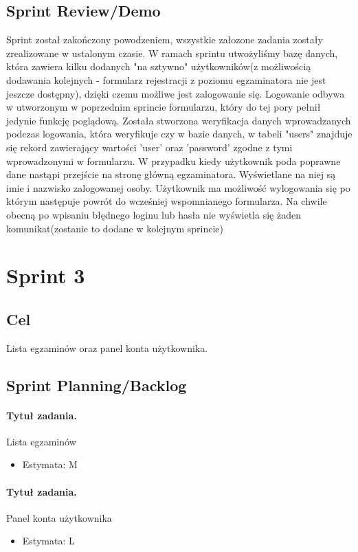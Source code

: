 \documentclass[a4paper]{article}
\begin{document}
\subsection{Sprint Review/Demo}
Sprint został zakończony powodzeniem, wszystkie załozone zadania zostały zrealizowane w ustalonym czasie. 
W ramach sprintu utwożyliśmy bazę danych, która zawiera kilku dodanych "na sztywno" użytkowników(z możliwością dodawania kolejnych - formularz rejestracji z poziomu egzaminatora nie jest jeszcze dostępny), dzięki czemu możliwe jest zalogowanie się. Logowanie odbywa w utworzonym w poprzednim sprincie formularzu, który do tej pory pełnił jedynie funkcję poglądową. Została stworzona weryfikacja danych wprowadzanych podczas logowania, która weryfikuje czy w bazie danych, w tabeli "users" znajduje się rekord zawierający wartości 'user' oraz 'password' zgodne z tymi wprowadzonymi w formularzu. W przypadku kiedy użytkownik  poda poprawne dane nastąpi przejście na stronę główną egzaminatora. Wyświetlane na niej są imie i nazwisko zalogowanej osoby. Użytkownik ma możliwość wylogowania się po którym następuje powrót do wcześniej wspomnianego formularza. Na chwile obecną po wpisaniu błędnego loginu lub hasła nie wyświetla się żaden komunikat(zostanie to dodane w kolejnym sprincie)

\section{Sprint 3}

\subsection{Cel}  Lista egzaminów oraz panel konta użytkownika.

\subsection{Sprint Planning/Backlog}

\paragraph{Tytuł zadania.} Lista egzaminów
\begin{itemize}
\item Estymata: M
\end{itemize} 

\paragraph{Tytuł zadania.} Panel konta użytkownika
\begin{itemize}
\item Estymata: L
\end{itemize} 
\end{document}
